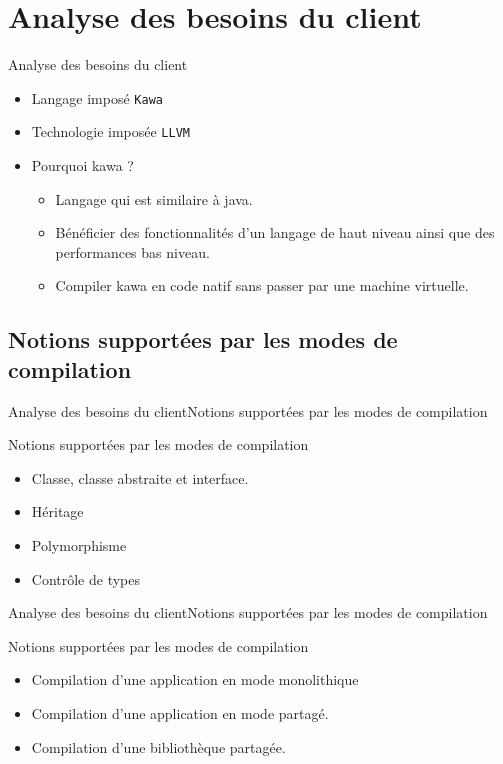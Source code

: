 \section{Analyse des besoins du client}
    \begin{frame}{Analyse des besoins du client}
      \begin{itemize}
        \item<1-> Langage imposé {\tt Kawa}
        \item<2-> Technologie imposée {\tt LLVM}
        \item<3-> Pourquoi kawa ?
          \begin{itemize}
            \item<4-> Langage qui est similaire à java.
            \item<5-> Bénéficier des fonctionnalités d'un langage de haut niveau ainsi que des performances bas niveau.
            \item<6-> Compiler kawa en code natif sans passer par une machine virtuelle.
          \end{itemize}
        
      \end{itemize}
    \end{frame}


  \subsection{Notions supportées par les modes de compilation}
    \begin{frame}{Analyse des besoins du client}{Notions supportées par les modes de compilation}
      \begin{block}{Notions supportées par les modes de compilation}
        \begin{itemize}
          \item<1-> Classe, classe abstraite et interface.
          \item<2-> Héritage
          \item<3-> Polymorphisme
          \item<4-> Contrôle de types
        \end{itemize}
      \end{block}
    \end{frame}

    \begin{frame}{Analyse des besoins du client}{Notions supportées par les modes de compilation}
      \begin{block}{Notions supportées par les modes de compilation}
        \begin{itemize}
          \item<1-> Compilation d'une application en mode monolithique
          \item<2-> Compilation d'une application en mode partagé.
          \item<3-> Compilation d'une bibliothèque partagée.
        \end{itemize}
      \end{block}
    \end{frame}
